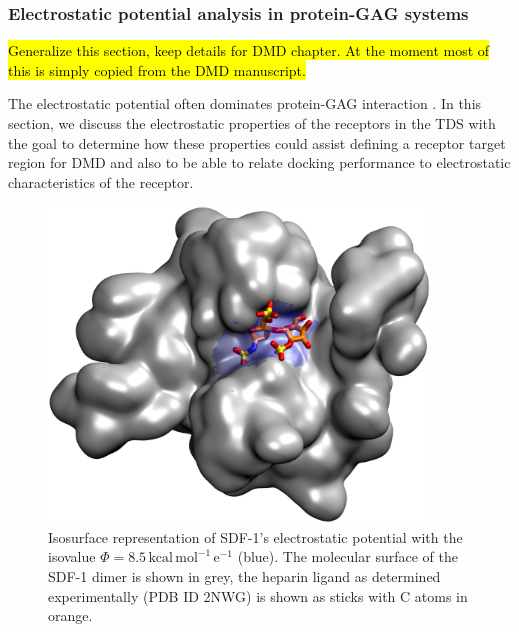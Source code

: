 \subsubsection{Electrostatic potential analysis in protein-GAG systems}

\hl{Generalize this section, keep details for DMD chapter. At the moment most of
this is simply copied from the DMD manuscript.}

The electrostatic potential often dominates protein-GAG interaction
\cite{gandhi_structure_2008}. In this section, we discuss the electrostatic
properties of the receptors in the TDS with the goal to determine how these
properties could assist defining a receptor target region for DMD and also to be
able to relate docking performance to electrostatic characteristics of the
receptor.


\begin{figure}
\centering
\includegraphics[width=0.9\textwidth]{gfx/bspred/sdf1_isopot_8_5_view1_rotated_jcc_pub_001.jpg}
\caption[]{
Isosurface representation of SDF-1's electrostatic potential with the isovalue
$\Phi = 8.5\,\mathrm{kcal\,mol^{-1}\,e^{-1}}$ (blue). The molecular surface of
the SDF-1 dimer is shown in grey, the heparin ligand as determined
experimentally (PDB ID 2NWG) is shown as sticks with C atoms in orange.
}
\label{fig:bspred:sdf1_estatic}
\end{figure}

